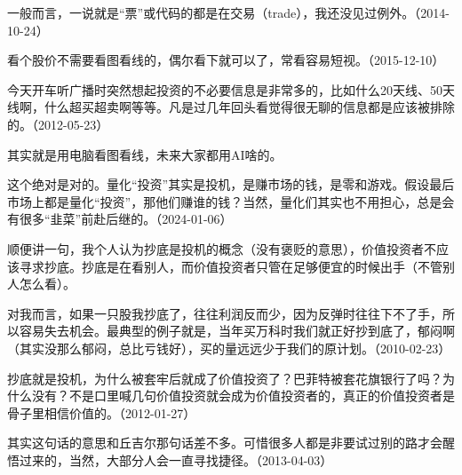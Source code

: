 一般而言，一说就是“票”或代码的都是在交易（trade），我还没见过例外。（2014-10-24）

看个股价不需要看图看线的，偶尔看下就可以了，常看容易短视。（2015-12-10）


今天开车听广播时突然想起投资的不必要信息是非常多的，比如什么20天线、50天线啊，什么超买超卖啊等等。凡是过几年回头看觉得很无聊的信息都是应该被排除的。（2012-05-23）


其实就是用电脑看图看线，未来大家都用AI啥的。


这个绝对是对的。量化“投资”其实是投机，是赚市场的钱，是零和游戏。假设最后市场上都是量化“投资”，那他们赚谁的钱？当然，量化们其实也不用担心，总是会有很多“韭菜”前赴后继的。（2024-01-06）

顺便讲一句，我个人认为抄底是投机的概念（没有褒贬的意思），价值投资者不应该寻求抄底。抄底是在看别人，而价值投资者只管在足够便宜的时候出手（不管别人怎么看）。

对我而言，如果一只股我抄底了，往往利润反而少，因为反弹时往往下不了手，所以容易失去机会。最典型的例子就是，当年买万科时我们就正好抄到底了，郁闷啊（其实没那么郁闷，总比亏钱好），买的量远远少于我们的原计划。（2010-02-23）


抄底就是投机，为什么被套牢后就成了价值投资了？巴菲特被套花旗银行了吗？为什么没有？不是口里喊几句价值投资就会成为价值投资者的，真正的价值投资者是骨子里相信价值的。（2012-01-27）


其实这句话的意思和丘吉尔那句话差不多。可惜很多人都是非要试过别的路才会醒悟过来的，当然，大部分人会一直寻找捷径。（2013-04-03）
